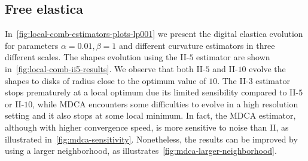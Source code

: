 \subsection{Free elastica}
\label{ch5:subsec:free-digital-elastica}
%
%
In~\cref{fig:local-comb-estimators-plots-lp001} we present the digital elastica evolution for parameters $\alpha=0.01, \beta=1$ and  different curvature estimators in three different scales. The shapes evolution using the II-$5$ estimator are shown in~\cref{fig:local-comb-ii5-results}. We observe that both II-$5$ and II-$10$ evolve the shapes to disks of radius close to the optimum value of $10$. The II-$3$ estimator stops prematurely at a local optimum due its limited sensibility compared to II-$5$ or II-$10$, while MDCA encounters some difficulties to evolve in a high resolution setting and it also stops at some local minimum. In fact, the MDCA estimator, although with higher convergence speed, is more sensitive to noise than II, as illustrated in~\cref{fig:mdca-sensitivity}. Nonetheless, the results can be improved by using a larger neighborhood, as illustrates~\cref{fig:mdca-larger-neighborhood}.




